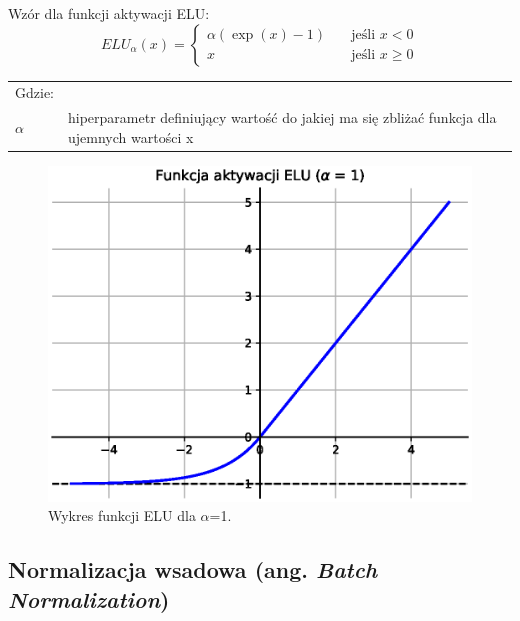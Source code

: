 \documentclass[a4paper,11pt]{article}
\begin{document}
    \noindent
    \begin{minipage}[H]{\textwidth}
        \setlength\parindent{17pt} Wzór dla funkcji aktywacji ELU: \\
        \begin{equation}
            \label{eq:elu}
            ELU_{\alpha}(x) =
            \begin{cases}
                \alpha(\exp(x)-1) & \quad \text{jeśli } x < 0 \\
                x & \quad \text{jeśli } x \geq 0
            \end{cases}
        \end{equation}
        \smallskip
        \begin{tabular}{p{}p{}}
            Gdzie: \\
            $\alpha$ & hiperparametr definiujący wartość do jakiej ma się zbliżać funkcja dla ujemnych wartości x \\
        \end{tabular}
    \end{minipage}

    \bigskip

    \begin{figure}[H]
        \label{fig:elu}
        \centering
        \includegraphics[width=\textwidth]{elu}
        \caption{Wykres funkcji ELU dla $\alpha$=1.}
    \end{figure}

    \subsection{Normalizacja wsadowa (ang. \textit{Batch Normalization})}
\end{document}

